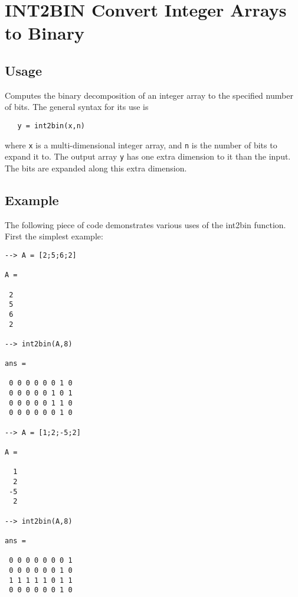 \section{INT2BIN Convert Integer Arrays to Binary}

\subsection{Usage}

Computes the binary decomposition of an integer array to the specified
number of bits.  The general syntax for its use is
\begin{verbatim}
   y = int2bin(x,n)
\end{verbatim}
where \verb|x| is a multi-dimensional integer array, and \verb|n| is the number
of bits to expand it to.  The output array \verb|y| has one extra dimension
to it than the input.  The bits are expanded along this extra dimension.
\subsection{Example}

The following piece of code demonstrates various uses of the int2bin
function.  First the simplest example:
\begin{verbatim}
--> A = [2;5;6;2]

A = 

 2 
 5 
 6 
 2 

--> int2bin(A,8)

ans = 

 0 0 0 0 0 0 1 0 
 0 0 0 0 0 1 0 1 
 0 0 0 0 0 1 1 0 
 0 0 0 0 0 0 1 0 

--> A = [1;2;-5;2]

A = 

  1 
  2 
 -5 
  2 

--> int2bin(A,8)

ans = 

 0 0 0 0 0 0 0 1 
 0 0 0 0 0 0 1 0 
 1 1 1 1 1 0 1 1 
 0 0 0 0 0 0 1 0 
\end{verbatim}
